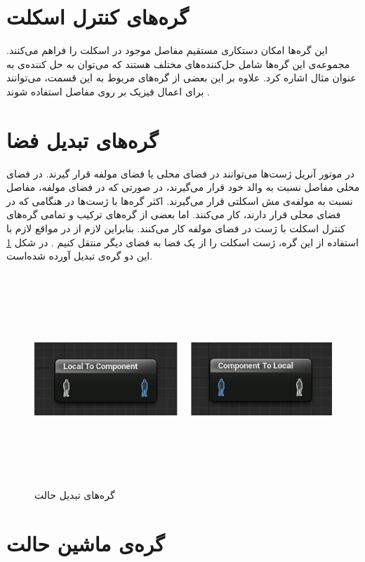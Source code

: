 \section{گره‌های کنترل اسکلت}

این گره‌ها امکان دستکاری مستقیم مفاصل موجود در اسکلت را فراهم می‌کنند.
مجموعه‌ی این گره‌ها شامل حل‌کننده‌های مختلف هستند که می‌توان به 
حل کننده‌ی 
به عنوان مثال اشاره کرد.
علاوه بر این بعضی از گره‌های مربوط به این قسمت، می‌توانند برای اعمال فیزیک بر روی 
مفاصل استفاده شوند \cite{SkeletalControlsUnrealEngine}.

\section{گره‌های تبدیل فضا}

در موتور آنریل ژست‌ها می‌توانند در فضای محلی یا فضای مولفه قرار گیرند.
در فضای محلی مفاصل نسبت به والد خود قرار می‌گیرند، در صورتی که 
در فضای مولفه، مفاصل نسبت به مولفه‌ی مش اسکلتی 
قرار می‌گیرند.
اکثر گره‌ها با ژست‌ها در هنگامی که در فضای محلی قرار دارند، کار می‌کنند.
اما بعضی از گره‌های ترکیب و تمامی گره‌های کنترل اسکلت 
با ژست در فضای مولفه کار می‌کنند. بنابراین لازم از در مواقع لازم با استفاده از 
این گره، ژست اسکلت را از یک فضا به فضای دیگر منتقل کنیم \cite{ChangeSpaceUnrealEngine}.
در شکل 
\ref{fig:ChnageSpaceNodes}
این دو گره‌ی تبدیل آورده شده‌است.

\begin{figure}[ht]
	\centerline{\includegraphics[width=\textwidth,height=8cm,keepaspectratio]{Figures/Ch3/ChnageSpaceNodes.png}}\hfill
	\caption{ گره‌های تبدیل حالت }
	\label{fig:ChnageSpaceNodes}
\end{figure}

\section{گره‌‌ی ماشین حالت}

